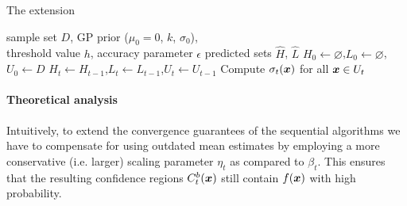 \begin{algorithm}[tb]
  \caption{The \bacl extension}
  \label{alg:bacl}
\small{
\begin{algorithmic}[1]
  \REQUIRE sample set $D$, GP prior ($\mu_0 = 0$, $k$, $\sigma_0$),\\
           \hspace{1.35em}threshold value $h$, accuracy parameter $\epsilon$
  \ENSURE predicted sets $\hat{H}$, $\hat{L}$
  \STATE $H_0 \gets \varnothing$,\enskip $L_0 \gets \varnothing$,\enskip $U_0 \gets D$ \label{lin:binit1}
   \label{lin:binit2}
    \STATE $H_t \gets H_{t-1}$,\enskip $L_t \gets L_{t-1}$,\enskip $U_t \gets U_{t-1}$
       \label{lin:bupd}
       \label{lin:bclass1}
       \label{lin:bclassr2}
      \ENDIF \label{lin:bclass2}
    \ENDFOR
     \label{lin:sel1}
    \STATE Compute $\sigma_t(\bm{x})$ for all $\bm{x} \in U_t$
  \ENDWHILE
   \label{lin:bret1}
   \label{lin:bret2}
\end{algorithmic}
}
\end{algorithm}

\paragraph{Theoretical analysis}
Intuitively, to extend the convergence guarantees of the sequential algorithms
we have to compensate for using outdated mean estimates
by employing a more conservative
(i.e. larger) scaling parameter $\eta_t$ as compared to $\beta_t$.
This ensures that the resulting confidence regions $C_t^b(\bm{x})$
still contain $f(\bm{x})$ with high probability.

